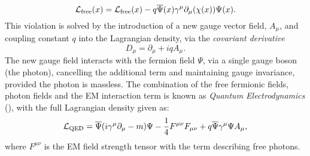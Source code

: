 \begin{equation}
\mathcal{L}_{\text{free}}(x) = \mathcal{L}_{\text{free}}(x)-q\overline{\Psi}(x)\gamma^{\mu}\partial_{\mu}(\chi(x))\Psi(x).
\end{equation}
This violation is solved by the introduction of a new gauge vector field, $A_{\mu}$, and coupling constant $q$ into the Lagrangian density, via the \textit{covariant derivative}
\begin{equation}
D_{\mu} = \partial_{\mu}+iqA_{\mu}.
\end{equation}
The new gauge field interacts with the fermion field $\Psi$, via a single gauge boson (the photon), cancelling the additional term and maintaining gauge invariance, provided the photon is massless.
The combination of the free fermionic fields, photon fields and the EM interaction term is known as \textit{Quantum Electrodynamics} (\QED{}), with the full Lagrangian density given as:
\begin{equation}
\mathcal{L}_{\mathrm{QED}}=\overline{\Psi}(i\gamma^{\mu}\partial_{\mu}-m)\Psi - \frac{1}{4}F^{\mu \nu }F_{\mu \nu } + q\overline{\Psi}\gamma^{\mu}\Psi A_{\mu},
\end{equation}
where $F^{\mu \nu}$ is the EM field strength tensor with the term describing free photons.

